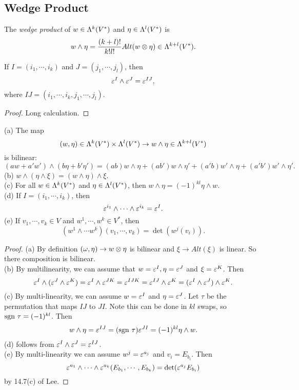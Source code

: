\subsection{Wedge Product}
The \textit{wedge product} of $w \in \Lambda^k(V^*)$ and $\eta \in \Lambda^l(V^*)$ is 
$$w \wedge \eta = \frac{(k+l)!}{k!l!}Alt(w \otimes \eta) \in \Lambda^{k+l}(V^*). $$
\begin{lemma}\label{14.10}
    If $I = (i_1,\cdots,i_k)$ and $J = (j_1,\cdots,j_l)$, then 
    $$\varepsilon^I \wedge \varepsilon^J = \varepsilon^{IJ},$$
    where $IJ = (i_1,\cdots,i_k,j_1,\cdots,j_l)$. 
\end{lemma}
\begin{proof}
    Long calculation. 
\end{proof}
\begin{proposition}\label{14.11}
(a) The map $$(w,\eta) \in \Lambda^k(V^*) \times \Lambda^l(V^*) \to w \wedge \eta \in \Lambda^{k+l}(V^*)$$ is bilinear:
$$(aw+a'w') \wedge (b\eta+b'\eta') = (ab)w \wedge \eta + (ab')w \wedge \eta' + (a'b)w' \wedge \eta + (a'b')w' \wedge \eta'.$$
(b) $w \wedge (\eta \wedge \xi) = (w \wedge \eta) \wedge \xi$. \\
(c) For all $w \in \Lambda^k(V^*)$ and $\eta \in \Lambda^l(V^*)$, then $w \wedge \eta = (-1)^{kl}\eta \wedge w$. \\
(d) If $I = (i_1,\cdots,i_k)$, then 
$$\varepsilon^{i_1} \wedge \cdots \wedge \varepsilon^{i_k} = \varepsilon^I.$$
(e) If $v_1,\cdots,v_k \in V$ and $w^1,\cdots,w^k \in V^*$, then 
$$(w^1 \wedge \cdots w^k)(v_1,\cdots,v_k) = \det (w^j(v_i)). $$
\end{proposition}
\begin{proof}
    (a) By definition $(\omega,\eta) \to w \otimes \eta$ is bilinear and $\xi \to Alt(\xi)$ is linear. So there composition is bilinear. \\
    (b) By multilinearity, we can assume that $w = \varepsilon^I, \eta = \varepsilon^J$ and $\xi = \varepsilon^K$. Then 
    $$\varepsilon^I \wedge (\varepsilon^J \wedge \varepsilon^K) = \varepsilon^I \wedge \varepsilon^{JK} = \varepsilon^{IJK} = \varepsilon^{IJ} \wedge \varepsilon^K = (\varepsilon^I \wedge \varepsilon^J) \wedge \varepsilon^K. $$
    (c) By multi-linearity, we can assume $w = \varepsilon^I$ and $\eta = \varepsilon^J$. Let $\tau$ be the permutation that maps $IJ$ to $JI$. Note this can be done in $kl$ swaps, so $\mathrm{sgn~} \tau = (-1)^{kl}$. Then 
    \begin{align*}
    w \wedge \eta = \varepsilon^{IJ} = (\mathrm{sgn~} \tau) \varepsilon^{JI}
    = (-1)^{kl}\eta \wedge w. 
    \end{align*}
    (d) follows from $\varepsilon^I \wedge \varepsilon^J = \varepsilon^{IJ}$. \\
    (e) By multi-linearity we can assume $w^j = \varepsilon^{a_j}$ and $v_i = E_{b_i}$. Then 
    $$\varepsilon^{a_1} \wedge \cdots \wedge \varepsilon^{a_k}(E_{b_1},\cdots,E_{b_k}) 
    = \det 
    (\varepsilon^{a_j} E_{b_i} )
    $$ 
    by 14.7(c) of Lee. 
\end{proof}

